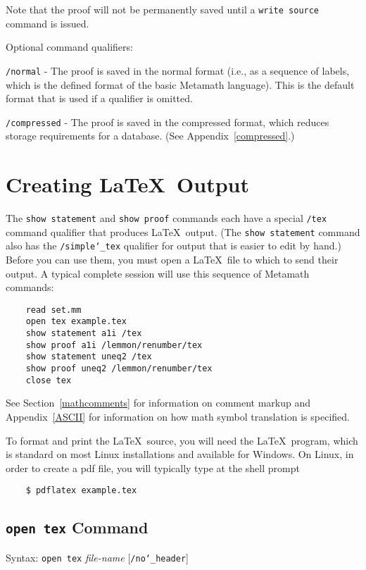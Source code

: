 Note that the proof will not be permanently saved until a \texttt{write
source} command is issued.

Optional command qualifiers:

    \texttt{/normal} - The proof is saved in the normal format (i.e., as a
        sequence of labels, which is the defined format of the basic Metamath
        language).  This is the default format that
        is used if a qualifier is omitted.

    \texttt{/compressed} - The proof is saved in the compressed format, which
        reduces storage requirements for a database.
        (See Appendix~\ref{compressed}.)



\section{Creating \LaTeX\ Output}\label{texout}

The \texttt{show statement} and \texttt{show proof} commands each have a
special \texttt{/tex} command qualifier that produces \LaTeX\ output.
(The \texttt{show statement} command also has the
\texttt{/simple{\char`\_}tex} qualifier for output that is easier to
edit by hand.)  Before you can use them, you must open a \LaTeX\ file to
which to send their output.  A typical complete session will use this
sequence of Metamath commands:

\begin{verbatim}
    read set.mm
    open tex example.tex
    show statement a1i /tex
    show proof a1i /lemmon/renumber/tex
    show statement uneq2 /tex
    show proof uneq2 /lemmon/renumber/tex
    close tex
\end{verbatim}

See Section~\ref{mathcomments} for information on comment markup and
Appendix~\ref{ASCII} for information on how math symbol translation is
specified.

To format and print the \LaTeX\ source, you will need the \LaTeX\
program, which is standard on most Linux installations and available for
Windows.  On Linux, in order to create a {\sc pdf} file, you will
typically type at the shell prompt
\begin{verbatim}
    $ pdflatex example.tex
\end{verbatim}

\subsection{\texttt{open tex} Command}
Syntax:  \texttt{open tex} {\em file-name} [\texttt{/no{\char`\_}header}]

